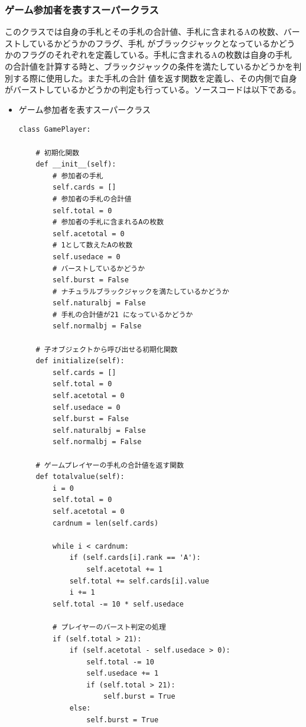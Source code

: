 \subsubsection{ゲーム参加者を表すスーパークラス}
このクラスでは自身の手札とその手札の合計値、手札に含まれるAの枚数、バーストしているかどうかのフラグ、手札
がブラックジャックとなっているかどうかのフラグのそれぞれを定義している。手札に含まれるAの枚数は自身の手札
の合計値を計算する時と、ブラックジャックの条件を満たしているかどうかを判別する際に使用した。また手札の合計
値を返す関数を定義し、その内側で自身がバーストしているかどうかの判定も行っている。ソースコードは以下である。
\begin{itemize}
\item ゲーム参加者を表すスーパークラス
\begin{lstlisting}
class GamePlayer:

    # 初期化関数
    def __init__(self):
        # 参加者の手札
        self.cards = []  
        # 参加者の手札の合計値
        self.total = 0  
        # 参加者の手札に含まれるAの枚数
        self.acetotal = 0  
        # 1として数えたAの枚数
        self.usedace = 0  
        # バーストしているかどうか
        self.burst = False  
        # ナチュラルブラックジャックを満たしているかどうか
        self.naturalbj = False 
        # 手札の合計値が21 になっているかどうか
        self.normalbj = False  

    # 子オブジェクトから呼び出せる初期化関数
    def initialize(self):
        self.cards = []
        self.total = 0
        self.acetotal = 0
        self.usedace = 0
        self.burst = False
        self.naturalbj = False
        self.normalbj = False

    # ゲームプレイヤーの手札の合計値を返す関数
    def totalvalue(self):
        i = 0
        self.total = 0
        self.acetotal = 0
        cardnum = len(self.cards)

        while i < cardnum:
            if (self.cards[i].rank == 'A'):
                self.acetotal += 1
            self.total += self.cards[i].value
            i += 1
        self.total -= 10 * self.usedace

        # プレイヤーのバースト判定の処理
        if (self.total > 21):
            if (self.acetotal - self.usedace > 0):
                self.total -= 10
                self.usedace += 1
                if (self.total > 21):
                    self.burst = True
            else:
                self.burst = True

\end{lstlisting}
\end{itemize}

